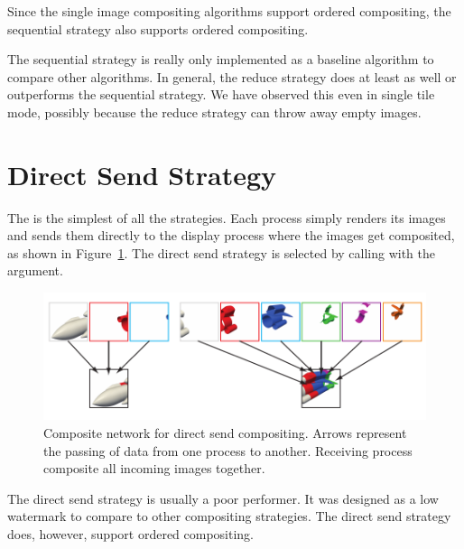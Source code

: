 Since the single image compositing algorithms support ordered
compositing, the sequential strategy also supports ordered compositing.

The sequential strategy is really only implemented as a baseline algorithm to
compare other algorithms.  In general, the reduce strategy does at least as
well or outperforms the sequential strategy.  We have observed this even in
single tile mode, possibly because the reduce strategy can throw away empty
images.


\section{Direct Send Strategy}
\label{sec:Strategies:DirectSend}


The  is the simplest of all the strategies.
Each process simply renders its images and sends them directly to the
display process where the images get composited, as shown in
Figure~\ref{fig:DirectSend}.  The direct send strategy is selected by
calling  with the 
argument.

\begin{figure}
  \centering
  \includegraphics{images/DirectSend}
  \caption[Direct send compositing network.]{Composite network for direct
    send compositing.  Arrows represent the passing of data from one
    process to another.  Receiving process composite all incoming images
    together.}
  \label{fig:DirectSend}
\end{figure}

The direct send strategy is usually a poor performer.  It was designed as a
low watermark to compare to other compositing strategies.  The direct send
strategy does, however, support ordered compositing.


